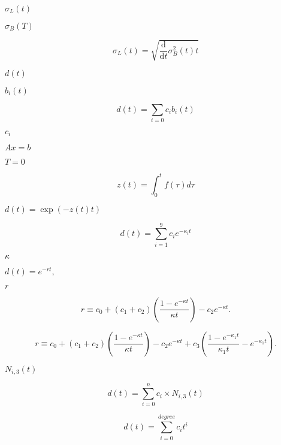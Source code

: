 \documentclass{article}
\begin{document}
$ \sigma_L(t) $
\pagebreak

$ \sigma_B(T) $
\pagebreak

\[    \sigma_L(t) = \sqrt{\frac{\mathrm{d}}{\mathrm{d}t}\sigma_B^2(t)t}
\]
\pagebreak

$ d(t) $
\pagebreak

$ b_i(t) $
\pagebreak

\[      d(t) = \sum_{i=0} c_i b_i(t)
\]
\pagebreak

$ c_i
$
\pagebreak

$ Ax = b $
\pagebreak

$ T=0 $
\pagebreak

\[z(t) = \int_0^t f(\tau) d\tau
\]
\pagebreak

$ d(t) = \exp \left( -z(t) t \right) $
\pagebreak

\[d(t) = \sum_{i=1}^9 c_i e^{-\kappa_i t}
\]
\pagebreak

$ \kappa $
\pagebreak

$ d(t) = e^{-r t}, $
\pagebreak

$r$
\pagebreak

\[r \equiv c_0 + (c_1 + c_2) \left( \frac{1 - e^{-\kappa t}}{\kappa t} \right) -
c_2 e^{ - \kappa t}.
\]
\pagebreak

\[r \equiv c_0 + (c_1 + c_2) \left( \frac {1 - e^{-\kappa t}}{\kappa t} \right)
- c_2 e^{ - \kappa t}
+ c_3 \left( \frac{1 - e^{-\kappa_1 t}}{\kappa_1 t} -e^{-\kappa_1 t} \right).
\]
\pagebreak

$ N_{i,3}(t) $
\pagebreak

\[d(t) = \sum_{i=0}^{n}  c_i \times N_{i,3}(t)
\]
\pagebreak

\[d(t) = \sum_{i=0}^{degree} c_i t^{i}
\]
\pagebreak
\end{document}

